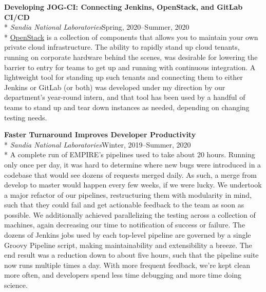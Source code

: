 \documentclass[margin,line,pifont,palatino,10pt]{res}
\begin{document}
\begin{resume}
{\bf Developing JOG-CI:  Connecting Jenkins, OpenStack, and GitLab CI/CD}\\*
{\it Sandia National Laboratories}\hfill Spring, 2020--Summer, 2020\\*
\href{https://www.openstack.org}{OpenStack} is a collection of components that allows you to maintain your own private cloud infrastructure.  The ability to rapidly stand up cloud tenants, running on corporate hardware behind the scenes, was desirable for lowering the barrier to entry for teams to get up and running with continuous integration.  A lightweight tool for standing up such tenants and connecting them to either Jenkins or GitLab (or both) was developed under my direction by our department's year-round intern, and that tool has been used by a handful of teams to stand up and tear down instances as needed, depending on changing testing needs.

{\bf Faster Turnaround Improves Developer Productivity}\\*
{\it Sandia National Laboratories}\hfill Winter, 2019--Summer, 2020\\*
A complete run of EMPIRE's pipelines used to take about 20 hours.  Running only once per day, it was hard to determine where new bugs were introduced in a codebase that would see dozens of requests merged daily.  As such, a merge from develop to master would happen every few weeks, if we were lucky.  We undertook a major refactor of our pipelines, restructuring them with modularity in mind, such that they could fail and get actionable feedback to the team as soon as possible.  We additionally achieved parallelizing the testing across a collection of machines, again decreasing our time to notification of success or failure.  The dozens of Jenkins jobs used by each top-level pipeline are governed by a single Groovy Pipeline script, making maintainability and extensibility a breeze.  The end result was a reduction down to about five hours, such that the pipeline suite now runs multiple times a day.  With more frequent feedback, we're kept clean more often, and developers spend less time debugging and more time doing science.


\end{resume}
\end{document}
